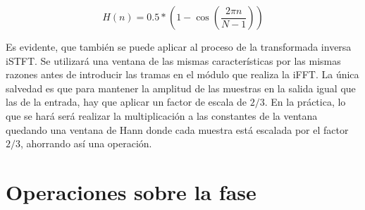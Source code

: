 \begin{equation}
\label{eq:Hann}
 H(n) = 0.5 * \left(1 - \cos\left(\frac{2\pi n}{N - 1}\right)\right)
 \end{equation} 
 
Es evidente, que también se puede aplicar al proceso de la transformada inversa iSTFT. Se utilizará una ventana de las mismas características por las mismas razones antes de introducir las tramas en el módulo que realiza la iFFT. La única salvedad es que para mantener la amplitud de las muestras en la salida igual que las de la entrada, hay que aplicar un factor de escala de $2/3$. En la práctica, lo que se hará será realizar la multiplicación a las constantes de la ventana quedando una ventana de Hann donde cada muestra está escalada por el factor $2/3$, ahorrando así una operación.

\section{Operaciones sobre la fase}



 
 



